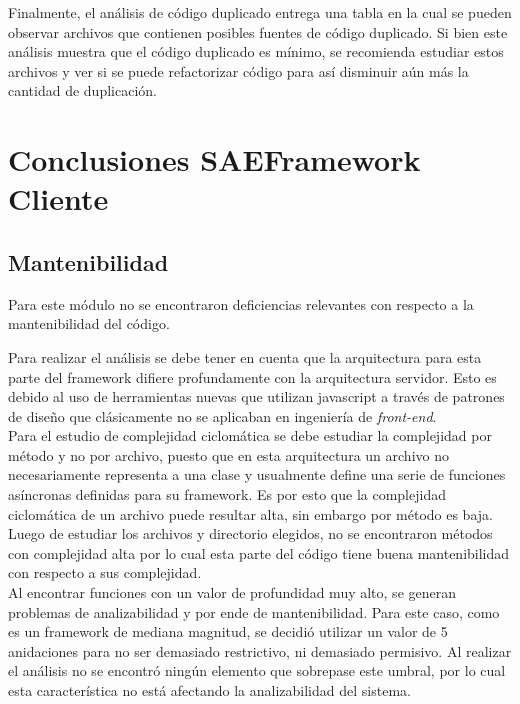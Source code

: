 Finalmente, el análisis de código duplicado entrega una tabla en la cual se 
pueden observar archivos que contienen posibles fuentes de código duplicado. 
Si bien este análisis muestra que el código duplicado es mínimo, se recomienda 
estudiar estos archivos y ver si se puede refactorizar código para así disminuir 
aún más la cantidad de duplicación.





\section{Conclusiones SAEFramework Cliente}

\subsection{Mantenibilidad}

Para este módulo no se encontraron deficiencias relevantes con respecto a la 
mantenibilidad del código.

Para realizar el análisis se debe tener en cuenta que la arquitectura para 
esta parte del framework difiere profundamente con la arquitectura servidor. 
Esto es debido al uso de herramientas nuevas que utilizan javascript a través 
de patrones de diseño que clásicamente no se aplicaban en ingeniería de \textit{front-end}.
\\

Para el estudio de complejidad ciclomática se debe estudiar la complejidad por 
método y no por archivo, puesto que en esta arquitectura un archivo no 
necesariamente representa a una clase y usualmente define una serie de funciones 
asíncronas definidas para su framework. Es por esto que la complejidad 
ciclomática de un archivo puede resultar alta, sin embargo por método es baja. 
Luego de estudiar los archivos y directorio elegidos, no se encontraron métodos 
con complejidad alta por lo cual esta parte del código tiene buena mantenibilidad 
con respecto a sus complejidad.
\\

Al encontrar funciones con un valor de profundidad muy alto, se generan 
problemas de analizabilidad y por ende de mantenibilidad. Para este caso, 
como es un framework de mediana magnitud, se decidió utilizar un valor de 5 
anidaciones para no ser demasiado restrictivo, ni demasiado permisivo. 
Al realizar el análisis no se encontró ningún elemento que sobrepase este 
umbral, por lo cual esta característica no está afectando la analizabilidad del 
sistema.
\\

